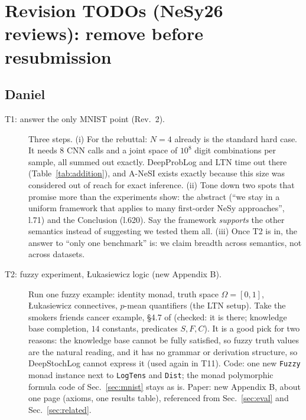 \documentclass[anon]{../../journal-templates/NeSy26/nesy2026} %
\begin{document}
\section*{Revision TODOs (NeSy26 reviews): remove before resubmission}

\subsection*{Daniel}

\begin{description}

\item[T1: answer the only MNIST point (Rev.~2).]
Three steps. (i) For the rebuttal: $N{=}4$ already is the standard hard
case. It needs $8$ CNN calls and a joint space of $10^{8}$ digit
combinations per sample, all summed out exactly. DeepProbLog and LTN time
out there (Table~\ref{tab:addition}), and A-NeSI \citep{kriekenANeSI2023}
exists exactly because this size was considered out of reach for exact
inference. (ii) Tone down two spots that promise more than the experiments
show: the abstract (``we stay in a uniform framework that applies to many
first-order NeSy approaches'', l.71) and the Conclusion (l.620). Say the
framework \emph{supports} the other semantics instead of suggesting we
tested them all. (iii) Once T2 is in, the answer to ``only one benchmark''
is: we claim breadth across semantics, not across datasets.

\item[T2: fuzzy experiment, {\L}ukasiewicz logic (new Appendix B).]
Run one fuzzy example: identity monad, truth space $\Omega=[0,1]$,
{\L}ukasiewicz connectives, $p$-mean quantifiers (the LTN setup). Take the
smokers friends cancer example, \S4.7 of
\citet{DBLP:journals/ai/BadreddineGSS22} (checked: it is there; knowledge
base completion, $14$ constants, predicates $S,F,C$). It is a good pick for
two reasons: the knowledge base cannot be fully satisfied, so fuzzy truth
values are the natural reading, and it has no grammar or derivation
structure, so DeepStochLog cannot express it (used again in T11). Code: one
new \texttt{Fuzzy} monad instance next to \texttt{LogTens} and
\texttt{Dist}; the monad polymorphic formula code of Sec.~\ref{sec:mnist}
stays as is. Paper: new Appendix B, about one page (axioms, one results
table), referenced from Sec.~\ref{sec:eval} and Sec.~\ref{sec:related}.


\end{description}
\end{document}

